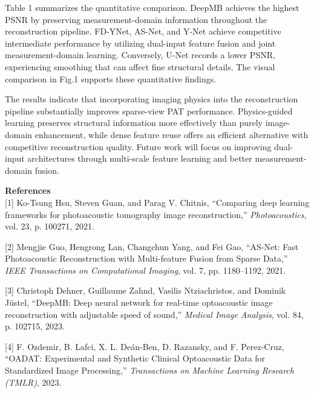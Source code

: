 \documentclass[10pt,a4paper]{article}
\begin{document}
Table 1 summarizes the quantitative comparison. DeepMB achieves the highest PSNR by preserving measurement-domain information throughout the reconstruction pipeline. FD-YNet, AS-Net, and Y-Net achieve competitive intermediate performance by utilizing dual-input feature fusion and joint measurement-domain learning. Conversely, U-Net records a lower PSNR, experiencing smoothing that can affect fine structural details. The visual comparison in Fig.1 supports these quantitative findings.

The results indicate that incorporating imaging physics into the reconstruction pipeline substantially improves sparse-view PAT performance. Physics-guided learning preserves structural information more effectively than purely image-domain enhancement, while dense feature reuse offers an efficient alternative with competitive reconstruction quality. Future work will focus on improving dual-input architectures through multi-scale feature learning and better measurement-domain fusion.

\vspace{10pt}
{\fontsize{8}{9}\selectfont
\textbf{References}\\[2pt]

[1] Ko-Tsung Hsu, Steven Guan, and Parag V. Chitnis, ``Comparing deep learning frameworks for photoacoustic tomography image reconstruction,'' \textit{Photoacoustics}, vol. 23, p. 100271, 2021.

[2] Mengjie Guo, Hengrong Lan, Changchun Yang, and Fei Gao, ``AS-Net: Fast Photoacoustic Reconstruction with Multi-feature Fusion from Sparse Data,'' \textit{IEEE Transactions on Computational Imaging}, vol. 7, pp. 1180--1192, 2021.

[3] Christoph Dehner, Guillaume Zahnd, Vasilis Ntziachristos, and Dominik Jüstel, ``DeepMB: Deep neural network for real-time optoacoustic image reconstruction with adjustable speed of sound,'' \textit{Medical Image Analysis}, vol. 84, p. 102715, 2023.

[4] F. Ozdemir, B. Lafci, X. L. Deán-Ben, D. Razansky, and F. Perez-Cruz, ``OADAT: Experimental and Synthetic Clinical Optoacoustic Data for Standardized Image Processing,'' \textit{Transactions on Machine Learning Research (TMLR)}, 2023.
}
\end{document}
